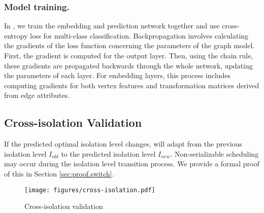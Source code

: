 
\subsubsection{Model training.} In \sysname, we train the embedding and prediction network together and use cross-entropy loss for multi-class classification. 
Backpropagation involves calculating the gradients of the loss function concerning the parameters of the graph model. First, the gradient is computed for the output layer. Then, using the chain rule, these gradients are propagated backwards through the whole network, updating the parameters of each layer. For embedding layers, this process includes computing gradients for both vertex features and transformation matrices derived from edge attributes.




\subsection{Cross-isolation Validation \label{design-3}} \label{sec:switch_mechanism}
If the predicted optimal isolation level changes, \sysname will adapt from the previous isolation level $I_{old}$ to the predicted isolation level $I_{new}$. Non-serializable scheduling may occur during the isolation level transition process. 
We provide a formal proof of this in Section \ref{sec:proof.switch}. 

\begin{figure}[t]
    \centering
    \texttt{[image: figures/cross-isolation.pdf]}
    \vspace{-2mm}
    \caption{Cross-isolation validation}
    \label{fig:cross-isolation}
    \vspace{-4mm}
\end{figure}


